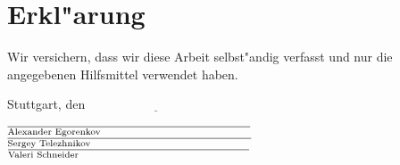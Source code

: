 \section{Erkl"arung}
\label{sec:Erkl"arung}

\vspace{100pt}

Wir versichern, dass wir diese Arbeit selbst"andig verfasst und nur die
angegebenen Hilfsmittel verwendet haben.

\vspace{50pt}

\noindent
Stuttgart, den $\underline{\hspace{128pt}}$

\vspace{50pt}

\noindent
$\overline{\mbox{\scriptsize{Alexander Egorenkov}\hspace{120pt}}}$\\

\noindent
$\overline{\mbox{\scriptsize{Sergey Telezhnikov}\hspace{129pt}}}$\\

\noindent
$\overline{\mbox{\scriptsize{Valeri Schneider}\hspace{137pt}}}$
